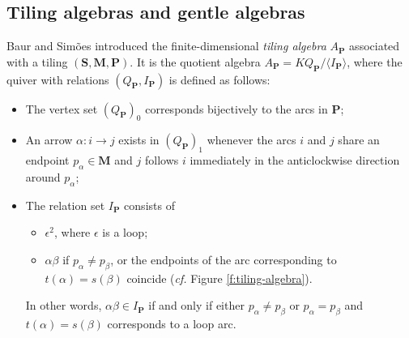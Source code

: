 \documentclass[a4paper,10pt]{amsart}
\theoremstyle{plain}          %
\theoremstyle{definition}
\def\SS{\mathbf{S}}
\def\Pf{\mathbf{P}}
\def\MM{\mathbf{M}}
\def\PP{\mathbf{P}}
\def\MM{\mathbf{M}}
\begin{document}
\subsection{Tiling algebras and gentle algebras}\label{s:def of tiling}
 Baur and Sim\~{o}es \cite{BS} introduced the finite-dimensional  \emph{tiling algebra} $A_{\Pf}$ associated with a tiling $(\SS,\MM,\Pf)$.
It is the quotient algebra $A_{\PP}=KQ_{\Pf}/\langle I_{\PP}\rangle$, where the quiver with relations $(Q_{\Pf}, I_{\Pf})$ is defined as follows:
\begin{itemize}
\item The vertex set $(Q_{\Pf})_0$ corresponds bijectively to the arcs in  $\Pf$;
\item An arrow $\alpha: i \to j$ exists in $(Q_{\Pf})_1$ whenever the arcs $i$ and $j$ share an endpoint $p_\alpha \in \MM$ and $j$ follows $i$ immediately in the anticlockwise direction around $p_\alpha$;
    \item The relation set $I_{\PP}$ consists of
    \begin{itemize}
        \item $\epsilon^2$, where $\epsilon$ is a loop;
        \item $\alpha\beta$ if $p_\alpha\neq p_\beta$, or the endpoints of the arc corresponding to $t(\alpha)=s(\beta)$ coincide ({\em cf.} Figure \ref{f:tiling-algebra}).
      
    \end{itemize}
      In other words, $\alpha\beta\in I_{\PP}$ if and only if either $p_{\alpha}\neq p_{\beta}$  or $p_{\alpha}=p_{\beta}$ and $t(\alpha)=s(\beta)$
corresponds to a loop arc.
\end{itemize}
\end{document}
